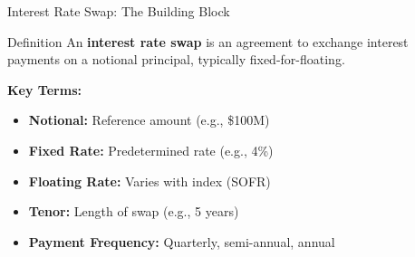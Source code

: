 \documentclass[aspectratio=169,11pt]{beamer}
\begin{document}
\begin{frame}{Interest Rate Swap: The Building Block}
\begin{block}{Definition}
An \textbf{interest rate swap} is an agreement to exchange interest payments on a notional principal, typically fixed-for-floating.
\end{block}

\begin{center}
\end{center}

\textbf{Key Terms:}
\begin{itemize}
    \item \textbf{Notional:} Reference amount (e.g., \$100M)
    \item \textbf{Fixed Rate:} Predetermined rate (e.g., 4\%)
    \item \textbf{Floating Rate:} Varies with index (SOFR)
    \item \textbf{Tenor:} Length of swap (e.g., 5 years)
    \item \textbf{Payment Frequency:} Quarterly, semi-annual, annual
\end{itemize}
\end{frame}
\end{document}
